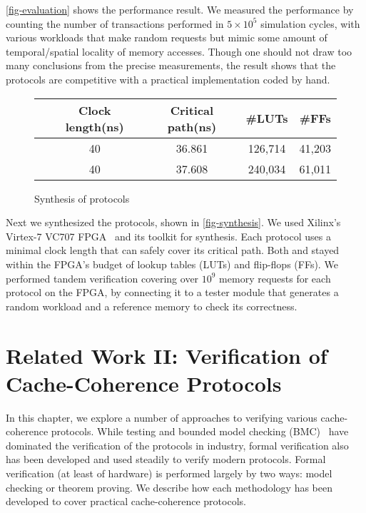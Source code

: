 \autoref{fig-evaluation} shows the performance result.
We measured the performance by counting the number of transactions performed in $5 \times 10^5$ simulation cycles, with various workloads that make random requests but mimic some amount of temporal/spatial locality of memory accesses.
Though one should not draw too many conclusions from the precise measurements, the result shows that the \hemiola{} protocols are competitive with a practical implementation coded by hand.

\begin{figure}[t]
  \centering
  \begin{tabular}{ccccc}
    \hline
    & Clock length\;(ns) & Critical path\;(ns) & \#LUTs & \#FFs\\
    \hline
    \bhemt{} & 40 & 36.861 & 126,714 & 41,203\\
    \bhemh{} & 40 & 37.608 & 240,034 & 61,011\\
    \hline
  \end{tabular}
  \caption{Synthesis of \hemiola{} protocols}
  \label{fig-synthesis}
\end{figure}

Next we synthesized the \hemiola{} protocols, shown in \autoref{fig-synthesis}.
We used Xilinx's Virtex-7 VC707 FPGA~\cite{vc707} and its toolkit for synthesis.
Each protocol uses a minimal clock length that can safely cover its critical path.
Both \bhemh{} and \bhemt{} stayed within the FPGA's budget of lookup tables (LUTs) and flip-flops (FFs).
We performed tandem verification covering over $10^9$ memory requests for each protocol on the FPGA, by connecting it to a tester module that generates a random workload and a reference memory to check its correctness.

\chapter{Related Work II: Verification of Cache-Coherence Protocols}
\label{sec-related-work-ii}

In this chapter, we explore a number of approaches to verifying various cache-coherence protocols.
While testing and bounded model checking (BMC)~\cite{BMC} have dominated the verification of the protocols in industry, formal verification also has been developed and used steadily to verify modern protocols.
Formal verification (at least of hardware) is performed largely by two ways: model checking or theorem proving.
We describe how each methodology has been developed to cover practical cache-coherence protocols.

